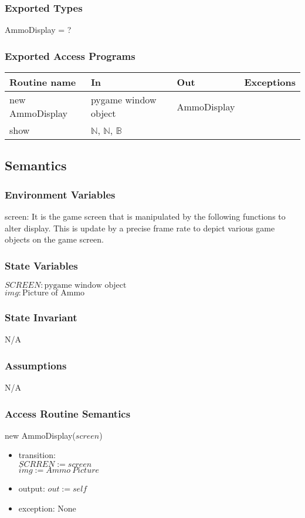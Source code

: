\documentclass[12pt]{article}
\begin{document}
\subsubsection*{Exported Types}
AmmoDisplay = ?
\subsubsection*{Exported Access Programs}

\begin{tabular}{| l | l | l | l |}
\hline
\textbf{Routine name} & \textbf{In} & \textbf{Out} & \textbf{Exceptions}\\
\hline
new AmmoDisplay       &pygame window object&     AmmoDisplay        &           \\
\hline
show       &	 $\mathbb{N}$, $\mathbb{N}$, $\mathbb{B}$    &           &          \\
\hline
\end{tabular}

\subsection*{Semantics}
\subsubsection*{Environment Variables}
screen: It is the game screen that is manipulated by the following functions to alter display. This is update by a precise frame rate to depict various game objects on the game screen.
\subsubsection*{State Variables}
$SCREEN : \text{pygame window object}$\\
$img : \text{Picture of Ammo}$
\subsubsection*{State Invariant}
N/A
\subsubsection*{Assumptions}
N/A
\subsubsection*{Access Routine Semantics}

new AmmoDisplay($screen$)
\begin{itemize}
    \item transition:\\
    $SCRREN := screen$\\
    $img := Ammo\ Picture$
    \item output: $out := self$
    \item exception: None
\end{itemize}
\end{document}
